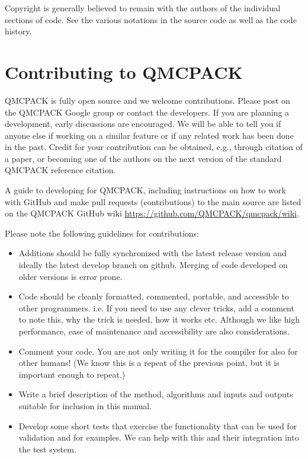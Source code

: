Copyright is generally believed to remain with the authors of the
individual sections of code. See the various notations in the source code as
well as the code history.

\section{Contributing to QMCPACK}
\label{sec:contributing}

QMCPACK is fully open source and we welcome contributions.  Please
post on the QMCPACK Google group or contact the developers. If you are
planning a development, early discussions are encouraged. We will be
able to tell you if anyone else if working on a similar feature or if
any related work has been done in the past.  Credit for your
contribution can be obtained, e.g., through citation of a paper, or
becoming one of the authors on the next version of the standard
QMCPACK reference citation.

A guide to developing for QMCPACK, including instructions on how to
work with GitHub and make pull requests (contributions) to the main
source are listed on the QMCPACK GitHub wiki
\url{https://github.com/QMCPACK/qmcpack/wiki}.

Please note the following guidelines for contributions:
\begin{itemize}
\item Additions should be fully synchronized with the latest release
  version and ideally the latest develop branch on github. Merging of code
  developed on older versions is error prone.
\item Code should be cleanly formatted, commented, portable, and accessible to
  other programmers. i.e. If you need to use any clever tricks, add a comment
  to note this, why the trick is needed, how it works etc. Although we like
  high performance, ease of maintenance and accessibility are also
  considerations.
\item Comment your code. You are not only writing it for the compiler
  for also for other humans! (We know this is a repeat of the previous
  point, but it is important enough to repeat.)
\item Write a brief description of the method, algorithms and inputs and outputs
  suitable for inclusion in this manual.
\item Develop some short tests that exercise the
  functionality that can be used for validation and for examples. We
  can help with this and their integration into the test system.
\end{itemize}

